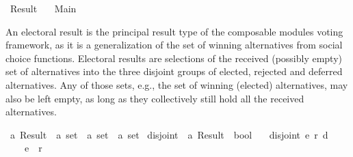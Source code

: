 %
\begin{isabellebody}%
%
%
\isadelimdocument
\isanewline
%
\endisadelimdocument
%
\isatagdocument
\isanewline
\isanewline
%
\isamarkuptrue%
%
\endisatagdocument
{\isafolddocument}%
%
\isadelimdocument
%
\endisadelimdocument
%
\isadelimtheory
%
\endisadelimtheory
%
\isatagtheory
{}\isamarkupfalse%
\ Result\isanewline
\ \ \ Main\isanewline
{}%
\endisatagtheory
{\isafoldtheory}%
%
\isadelimtheory
%
\endisadelimtheory
%
\begin{isamarkuptext}%
An electoral result is the principal result type of the composable modules
voting framework, as it is a generalization of the set of winning alternatives
from social choice functions. Electoral results are selections of the received
(possibly empty) set of alternatives into the three disjoint groups of elected,
rejected and deferred alternatives.
Any of those sets, e.g., the set of winning (elected) alternatives, may also
be left empty, as long as they collectively still hold all the received
alternatives.%
\end{isamarkuptext}\isamarkuptrue%
%
\isadelimdocument
%
\endisadelimdocument
%
\isatagdocument
%
\isamarkuptrue%
%
\endisatagdocument
{\isafolddocument}%
%
\isadelimdocument
%
\endisadelimdocument
{}\isamarkupfalse%
\ {\isacharprime}{\kern0pt}a\ Result\ {\isacharequal}{\kern0pt}\ {\isachardoublequoteopen}{\isacharprime}{\kern0pt}a\ set\ {\isacharasterisk}{\kern0pt}\ {\isacharprime}{\kern0pt}a\ set\ {\isacharasterisk}{\kern0pt}\ {\isacharprime}{\kern0pt}a\ set{\isachardoublequoteclose}%
\isadelimdocument
%
\endisadelimdocument
%
\isatagdocument
%
\isamarkuptrue%
%
\endisatagdocument
{\isafolddocument}%
%
\isadelimdocument
%
\endisadelimdocument
{}\isamarkupfalse%
\ disjoint{}\ {\isacharcolon}{\kern0pt}{\isacharcolon}{\kern0pt}\ {\isachardoublequoteopen}{\isacharprime}{\kern0pt}a\ Result\ {\isasymRightarrow}\ bool{\isachardoublequoteclose}\ \isanewline
\ \ {\isachardoublequoteopen}disjoint{}\ {\isacharparenleft}{\kern0pt}e{\isacharcomma}{\kern0pt}\ r{\isacharcomma}{\kern0pt}\ d{\isacharparenright}{\kern0pt}\ {\isacharequal}{\kern0pt}\isanewline
\ \ \ \ {\isacharparenleft}{\kern0pt}{\isacharparenleft}{\kern0pt}e\ {\isasyminter}\ r\ {\isacharequal}{\kern0pt}\ {\isacharbraceleft}{\kern0pt}{\isacharbraceright}{\kern0pt}{\isacharparenright}{\kern0pt}\ {\isasymand}\isanewline

\end{isabellebody}
